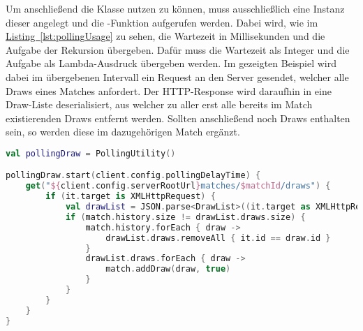 Um anschließend die Klasse  nutzen zu können, muss ausschließlich eine Instanz dieser angelegt und die -Funktion aufgerufen werden. Dabei wird, wie im \hyperref[lst:pollingUsage]{Listing~\ref{lst:pollingUsage}} zu sehen, die Wartezeit in Millisekunden und die Aufgabe der Rekursion übergeben. Dafür muss die Wartezeit als Integer und die Aufgabe als Lambda-Ausdruck übergeben werden. Im gezeigten Beispiel wird dabei im übergebenen Intervall ein Request an den Server gesendet, welcher alle Draws eines Matches anfordert. Der \gls{HTTP}-Response wird daraufhin in eine Draw-Liste deserialisiert, aus welcher zu aller erst alle bereits im Match existierenden Draws entfernt werden. Sollten anschließend noch Draws enthalten sein, so werden diese im dazugehörigen Match ergänzt.\\
\begin{lstlisting}[style=lstStyleFramed, language=Kotlin, caption={Einbindung bzw. Nutzung der \code{PollingUtility} Klasse}, label=lst:pollingUsage, float]
val pollingDraw = PollingUtility()

pollingDraw.start(client.config.pollingDelayTime) {
	get("${client.config.serverRootUrl}matches/$matchId/draws") {
		if (it.target is XMLHttpRequest) {
			val drawList = JSON.parse<DrawList>((it.target as XMLHttpRequest).responseText)
			if (match.history.size != drawList.draws.size) {
				match.history.forEach { draw ->
					drawList.draws.removeAll { it.id == draw.id }
				}
				drawList.draws.forEach { draw ->
					match.addDraw(draw, true)
				}
			}
		}
	}
}
\end{lstlisting}
